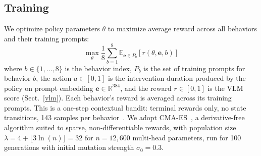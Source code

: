 \documentclass{article}
\begin{document}
\subsection{Training}
\label{sec:training}

We optimize policy parameters $\theta$ to maximize average reward across all behaviors and their training prompts:
\begin{equation}
\max_\theta \frac{1}{8} \sum_{b=1}^{8} \mathbb{E}_{\mathbf{e} \in P_b}[r(\theta, \mathbf{e}, b)]
\label{eq:objective}
\end{equation}
where $b \in \{1, \ldots, 8\}$ is the behavior index, $P_b$ is the set of training prompts for behavior $b$, the action $a \in [0, 1]$ is the intervention duration produced by the policy on prompt embedding $\mathbf{e} \in \mathbb{R}^{384}$, and the reward $r \in [0, 1]$ is the VLM score (Sect.~\ref{vlm}). Each behavior's reward is averaged across its training prompts. This is a one-step contextual bandit: terminal rewards only, no state transitions, 143 samples per behavior~\cite{may2012optimistic, wang2017optimal}. We adopt CMA-ES~\cite{hansen2001completely}, a derivative-free algorithm suited to sparse, non-differentiable rewards, with population size $\lambda = 4 + \lfloor 3 \ln(n) \rfloor = 32$ for $n = 12{,}600$ multi-head parameters, run for 100 generations with initial mutation strength $\sigma_0 = 0.3$.
\end{document}
